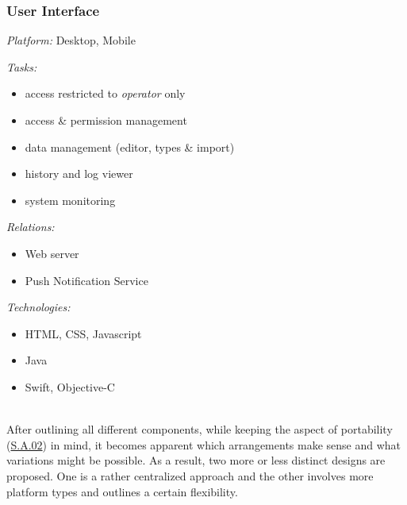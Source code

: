 \documentclass[12pt,english,a4paper,titlepage,cleardoublepage=empty,dottedtoc]{report}
\providecommand{\tightlist}{%
  \setlength{\itemsep}{0pt}\setlength{\parskip}{0pt}}
\begin{document}
\subsubsection*{User Interface}\label{user-interface}

\emph{Platform:} Desktop, Mobile

\emph{Tasks:}

\begin{itemize}
\tightlist
\item
  access restricted to \emph{operator} only
\item
  access \& permission management
\item
  data management (editor, types \& import)
\item
  history and log viewer
\item
  system monitoring
\end{itemize}

\emph{Relations:}

\begin{itemize}
\tightlist
\item
  Web server
\item
  Push Notification Service
\end{itemize}

\emph{Technologies:}

\begin{itemize}
\tightlist
\item
  HTML, CSS, Javascript
\item
  Java
\item
  Swift, Objective-C
\end{itemize}

~\\
After outlining all different components, while keeping the aspect of
portability (\protect\hyperlink{sa02}{S.A.02}) in mind, it becomes
apparent which arrangements make sense and what variations might be
possible. As a result, two more or less distinct designs are proposed.
One is a rather centralized approach and the other involves more
platform types and outlines a certain flexibility.
\end{document}
